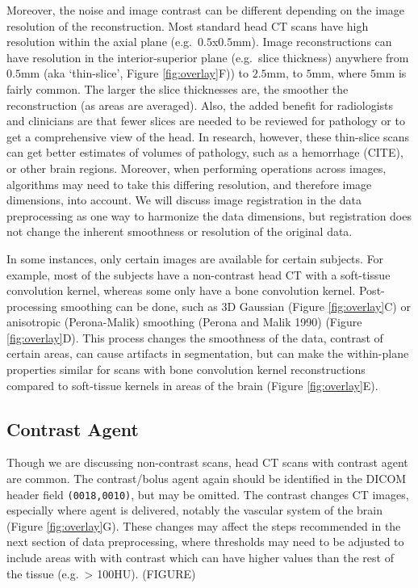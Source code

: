 \documentclass[]{elsarticle} %
\begin{document}
Moreover, the noise and image contrast can be different depending on the image resolution of the reconstruction. Most standard head CT scans have high resolution within the axial plane (e.g.~\(0.5\)x\(0.5\)mm). Image reconstructions can have resolution in the interior-superior plane (e.g.~slice thickness) anywhere from \(0.5\)mm (aka `thin-slice', Figure \ref{fig:overlay}F)) to \(2.5\)mm, to \(5\)mm, where \(5\)mm is fairly common. The larger the slice thicknesses are, the smoother the reconstruction (as areas are averaged). Also, the added benefit for radiologists and clinicians are that fewer slices are needed to be reviewed for pathology or to get a comprehensive view of the head. In research, however, these thin-slice scans can get better estimates of volumes of pathology, such as a hemorrhage (CITE), or other brain regions. Moreover, when performing operations across images, algorithms may need to take this differing resolution, and therefore image dimensions, into account. We will discuss image registration in the data preprocessing as one way to harmonize the data dimensions, but registration does not change the inherent smoothness or resolution of the original data.

In some instances, only certain images are available for certain subjects. For example, most of the subjects have a non-contrast head CT with a soft-tissue convolution kernel, whereas some only have a bone convolution kernel. Post-processing smoothing can be done, such as 3D Gaussian (Figure \ref{fig:overlay}C) or anisotropic (Perona-Malik) smoothing (Perona and Malik 1990) (Figure \ref{fig:overlay}D). This process changes the smoothness of the data, contrast of certain areas, can cause artifacts in segmentation, but can make the within-plane properties similar for scans with bone convolution kernel reconstructions compared to soft-tissue kernels in areas of the brain (Figure \ref{fig:overlay}E).

\hypertarget{contrast-agent}{%
\subsection{Contrast Agent}\label{contrast-agent}}

Though we are discussing non-contrast scans, head CT scans with contrast agent are common. The contrast/bolus agent again should be identified in the DICOM header field \texttt{(0018,0010)}, but may be omitted. The contrast changes CT images, especially where agent is delivered, notably the vascular system of the brain (Figure \ref{fig:overlay}G). These changes may affect the steps recommended in the next section of data preprocessing, where thresholds may need to be adjusted to include areas with with contrast which can have higher values than the rest of the tissue (e.g.~\textgreater{} 100HU). (FIGURE)
\end{document}
